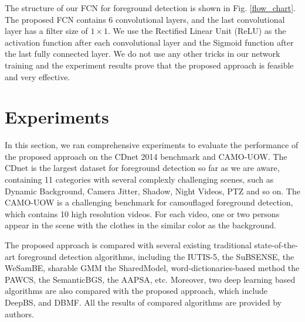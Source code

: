 \documentclass[journal]{IEEEtran}
\newcommand{\reffig}[1]{Fig. \ref{#1}}
\begin{document}


The structure of our FCN for foreground detection is shown in \reffig{flow_chart}. 
The proposed FCN contains 6 convolutional layers, and the last convolutional layer has a filter size of $1\times 1$. 
We use the Rectified Linear Unit (ReLU) as the activation function after each convolutional layer and the Sigmoid function after the last fully connected layer. 
We do not use any other tricks in our network training and the experiment results prove that the proposed approach is feasible and very effective.


\section{Experiments}
\label{sec5}
In this section, we ran comprehensive experiments to evaluate the performance of the proposed approach on the CDnet 2014 benchmark\cite{CDN2014} and CAMO-UOW\cite{CAMO}. 
The CDnet is the largest dataset for foreground detection so far as we are aware, containing 11 categories with several complexly challenging scenes, such as Dynamic Background, Camera Jitter, Shadow, Night Videos, PTZ and so on. 
The CAMO-UOW is a challenging benchmark for camouflaged foreground detection, which contains 10 high resolution videos. 
For each video, one or two persons appear in the scene with the clothes in the similar color as the background.

The proposed approach is compared with several existing traditional state-of-the-art foreground detection algorithms, including the IUTIS-5\cite{Bianco2017TEC}, the SuBSENSE\cite{St-Charles2015SuBSENSE}, the WeSamBE\cite{Jiang2017WeSamBE}, sharable GMM the SharedModel\cite{Chen2015SharedModel}, word-dictionaries-based method the PAWCS\cite{Charles2015PAWCS}, the SemanticBGS\cite{Braham2017Semantic}, the AAPSA\cite{RAMIREZALONSO2016990}, etc. 
Moreover, two deep learning based algorithms are also compared with the proposed approach, which include DeepBS\cite{Babaee2017deep}, and DBMF\cite{Yang2018DBMF}. 
All the results of compared algorithms are provided by authors.
\end{document}

